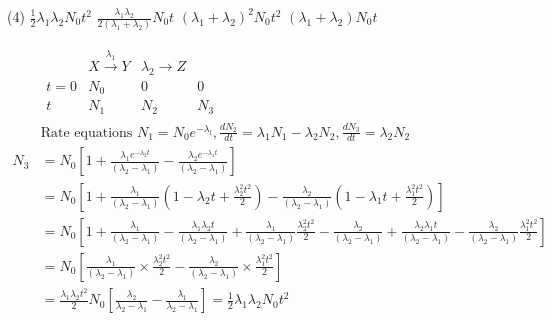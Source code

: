 \begin{enumerate}
{	}
\begin{tasks}(4)
\task[\textbf{A.}] $\frac{1}{2} \lambda_{1} \lambda_{2} N_{0} t^{2}$
\task[\textbf{B.}] $\frac{\lambda_{1} \lambda_{2}}{2\left(\lambda_{1}+\lambda_{2}\right)} N_{0} t$
\task[\textbf{C.}] $\left(\lambda_{1}+\lambda_{2}\right)^{2} N_{0} t^{2}$
\task[\textbf{D.}] $\left(\lambda_{1}+\lambda_{2}\right) N_{0} t$
\end{tasks}
\begin{answer}
\begin{align*}
&\begin{array}{llll} & X \stackrel{\lambda_{1}}{\longrightarrow} Y & \lambda_{2} \rightarrow Z \\ t=0 & N_{0} & 0 & 0 \\ t & N_{1} & N_{2} & N_{3}\end{array}\\
&\text{Rate equations }N_{1}=N_{0} e^{-\lambda_{l}}, \frac{d N_{2}}{d t}=\lambda_{1} N_{1}-\lambda_{2} N_{2}, \frac{d N_{3}}{d t}=\lambda_{2} N_{2}\\
N_{3}&=N_{0}\left[1+\frac{\lambda_{1} e^{-\lambda_{2} t}}{\left(\lambda_{2}-\lambda_{1}\right)}-\frac{\lambda_{2} e^{-\lambda_{1} t}}{\left(\lambda_{2}-\lambda_{1}\right)}\right]\\
&=N_{0}\left[1+\frac{\lambda_{1}}{\left(\lambda_{2}-\lambda_{1}\right)}\left(1-\lambda_{2} t+\frac{\lambda_{2}^{2} t^{2}}{2}\right)-\frac{\lambda_{2}}{\left(\lambda_{2}-\lambda_{1}\right)}\left(1-\lambda_{1} t+\frac{\lambda_{1}^{2} t^{2}}{2}\right)\right]\\
&=N_{0}\left[1+\frac{\lambda_{1}}{\left(\lambda_{2}-\lambda_{1}\right)}-\frac{\lambda_{1} \lambda_{2} t}{\left(\lambda_{2}-\lambda_{1}\right)}+\frac{\lambda_{1}}{\left(\lambda_{2}-\lambda_{1}\right)} \frac{\lambda_{2}^{2} t^{2}}{2}-\frac{\lambda_{2}}{\left(\lambda_{2}-\lambda_{1}\right)}+\frac{\lambda_{2} \lambda_{1} t}{\left(\lambda_{2}-\lambda_{1}\right)}-\frac{\lambda_{2}}{\left(\lambda_{2}-\lambda_{1}\right)} \frac{\lambda_{1}^{2} t^{2}}{2}\right]\\
&=N_{0}\left[\frac{\lambda_{1}}{\left(\lambda_{2}-\lambda_{1}\right)} \times \frac{\lambda_{2}^{2} t^{2}}{2}-\frac{\lambda_{2}}{\left(\lambda_{2}-\lambda_{1}\right)} \times \frac{\lambda_{1}^{2} t^{2}}{2}\right]\\
&=\frac{\lambda_{1} \lambda_{2} t^{2}}{2} N_{0}\left[\frac{\lambda_{2}}{\lambda_{2}-\lambda_{1}}-\frac{\lambda_{1}}{\lambda_{2}-\lambda_{1}}\right]=\frac{1}{2} \lambda_{1} \lambda_{2} N_{0} t^{2}
\end{align*}

\end{answer}
\end{enumerate}
